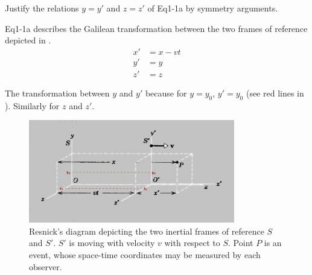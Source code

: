 \begin{question}
  Justify the relations $y = y'$ and $z = z'$ of Eq1-1a by symmetry arguments.
\end{question}

\begin{solution}
  Eq1-1a describes the Galilean transformation between the two frames of reference depicted in .
  \begin{align*}
    x' &= x - vt \\
    y' &= y \\
    z' &= z
  \end{align*}

  The transformation between $y$ and $y'$ because for $y=y_0$, $y'=y_0$ (see red lines in ). Similarly for $z$ and $z'$.

  \begin{figure} \centering
  \includegraphics[width=9cm]{fig/1q1.png}
  \caption{Resnick's diagram depicting the two inertial frames of reference $S$ and $S'$. $S'$ is moving with velocity $v$ with respect to $S$. Point $P$ is an event, whose space-time coordinates may be measured by each observer.}\label{fig:1q1}
  \end{figure}
\end{solution}

